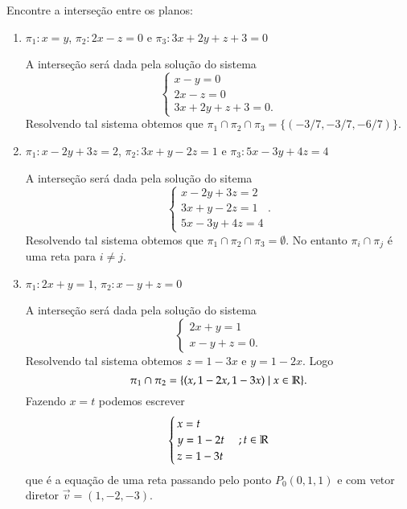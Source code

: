 \begin{exemplos}
    Encontre a interse\c{c}\~ao entre os planos:
    \begin{enumerate}
        \item $\pi_1 : x = y$, $\pi_2 : 2x - z = 0$ e $\pi_3 : 3x + 2y + z + 3 = 0$
        \begin{solucao}
            A interse\c{c}\~ao ser\'a dada pela solu\c{c}\~ao do sistema
            \[
                \begin{cases}
                    x - y = 0\\
                    2x - z = 0\\
                    3x + 2y + z + 3 = 0.
                \end{cases}
            \]
            Resolvendo tal sistema obtemos que $\pi_1\cap\pi_2\cap\pi_3 = \{(-3/7,-3/7,-6/7)\}$.
        \end{solucao}
        \item $\pi_1 : x - 2y + 3z = 2$, $\pi_2 : 3x + y - 2z = 1$ e $\pi_3 : 5x - 3y + 4z = 4$
        \begin{solucao}
            A interse\c{c}\~ao ser\'a dada pela solu\c{c}\~ao do sitema
            \[
                \begin{cases}
                    x - 2y + 3z = 2\\
                    3x + y - 2z = 1\\
                    5x - 3y + 4z = 4
                \end{cases}.
            \]
            Resolvendo tal sistema obtemos que $\pi_1 \cap \pi_2 \cap \pi_3 = \emptyset$. No entanto $\pi_i \cap \pi_j$ \'e uma reta para $i \ne j$.
        \end{solucao}
        \item $\pi_1 : 2x + y = 1$, $\pi_2 : x - y + z = 0$
        \begin{solucao}
            A interse\c{c}\~ao ser\'a dada pela solu\c{c}\~ao do sistema
            \[
                \begin{cases}
                    2x + y = 1\\
                    x - y + z = 0.
                \end{cases}
            \]
            Resolvendo tal sistema obtemos $z = 1 - 3x$ e $y = 1 - 2x$. Logo
            \[
                \pi_1\cap\pi_2 = \{(x,1 - 2x,1 - 3x) \mid x \in \mathbb{R}\}.
            \]
            Fazendo $x = t$ podemos escrever
            \[
                \begin{cases}
                    x = t\\
                    y = 1 - 2t\\
                    z = 1 - 3t
                \end{cases}; t \in \mathbb{R}
            \]
            que \'e a equa\c{c}\~ao de uma reta passando pelo ponto $P_0(0,1,1)$ e com vetor diretor $\vec{v} = (1,-2,-3)$.
        \end{solucao}
    \end{enumerate}
\end{exemplos}

